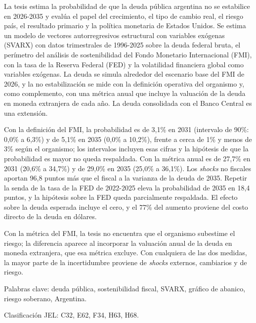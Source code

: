 La tesis estima la probabilidad de que la deuda pública argentina no se
estabilice en 2026-2035 y evalúa el papel del crecimiento, el tipo de
cambio real, el riesgo país, el resultado primario y la política
monetaria de Estados Unidos. Se estima un modelo de vectores
autorregresivos estructural con variables exógenas (SVARX) con datos
trimestrales de 1996-2025 sobre la deuda federal bruta, el perímetro del
análisis de sostenibilidad del Fondo Monetario Internacional (FMI), con
la tasa de la Reserva Federal (FED) y la volatilidad financiera global
como variables exógenas. La deuda se simula alrededor del escenario base
del FMI de 2026, y la no estabilización se mide con la definición
operativa del organismo y, como complemento, con una métrica anual que
incluye la valuación de la deuda en moneda extranjera de cada año. La
deuda consolidada con el Banco Central es una extensión.

Con la definición del FMI, la probabilidad es de 3,1\% en 2031
(intervalo de 90\%: 0,0\% a 6,3\%) y de 5,1\% en 2035 (0,0\% a 10,2\%),
frente a cerca de 1\% y menos de 3\% según el organismo; los intervalos
incluyen esas cifras y la hipótesis de que la probabilidad es mayor no
queda respaldada. Con la métrica anual es de 27,7\% en 2031 (20,6\% a
34,7\%) y de 29,0\% en 2035 (25,0\% a 36,1\%). Los \emph{shocks} no
fiscales aportan 96,8 puntos más que el fiscal a la varianza de la deuda
de 2035. Repetir la senda de la tasa de la FED de 2022-2025 eleva la
probabilidad de 2035 en 18,4 puntos, y la hipótesis sobre la FED queda
parcialmente respaldada. El efecto sobre la deuda esperada incluye el
cero, y el 77\% del aumento proviene del costo directo de la deuda en
dólares.

Con la métrica del FMI, la tesis no encuentra que el organismo subestime
el riesgo; la diferencia aparece al incorporar la valuación anual de la
deuda en moneda extranjera, que esa métrica excluye. Con cualquiera de
las dos medidas, la mayor parte de la incertidumbre proviene de
\emph{shocks} externos, cambiarios y de riesgo.

Palabras clave: deuda pública, sostenibilidad fiscal, SVARX, gráfico de
abanico, riesgo soberano, Argentina.

Clasificación JEL: C32, E62, F34, H63, H68.
